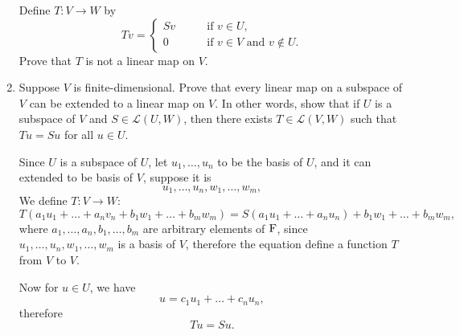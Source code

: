 \begin{enumerate}
        Define $T: V \to W$ by 
        \[ Tv = 
            \begin{cases}
                Sv \qquad& \text{if $v \in U$}, \\
                0 \qquad& \text{if $v \in V$ and $v \notin U$.}
            \end{cases}
        \]
        Prove that $T$ is not a linear map on $V$.
    \item Suppose $V$ is finite-dimensional. Prove that every linear map on a subspace of $V$ can be extended to a linear map on $V$.
        In other words, show that if $U$ is a subspace of $V$ and $S \in \mathcal{L}(U,W)$, then there exists $T \in \mathcal{L}(V,W)$ such 
        that $Tu = Su$ for all $u \in U$.
        \begin{solution}
            Since $U$ is a subspace of $U$, let $u_1,\ldots,u_n$ to be the basis of $U$, and it can extended to be basis of $V$, suppose it is 
            \[ u_1, \ldots, u_n, w_1, \ldots, w_m,\]
            We define $T: V \to W$:
            \[ T(a_1u_1 + \dots + a_nv_n + b_1w_1 + \dots + b_mw_m) = S(a_1u_1+\dots+a_nu_n) + b_1w_1 + \dots + b_mw_m, \]
            where $a_1,\ldots,a_n,b_1,\ldots, b_m$ are arbitrary elements of $\mathrm{F}$, since $u_1,\ldots,u_n,w_1,\ldots,w_m$ is a basis of $V$, therefore 
            the equation define a function $T$ from $V$ to $V$. 

            Now for $u \in U$, we have 
            \[ u = c_1u_1 + \dots + c_nu_n, \]
            therefore 
            \[ Tu = Su .\]


\end{solution}
\end{enumerate}
